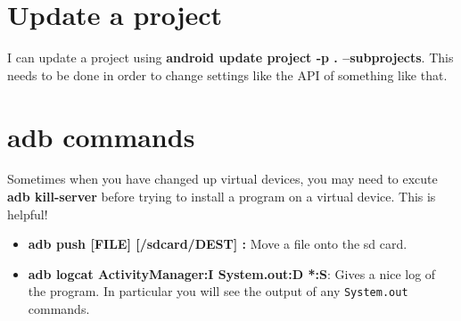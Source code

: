 \documentclass[english]{article}
\begin{document}
\section*{Update a project}
I can update a project using \textbf{android update project -p . --subprojects}. This needs to be done in order to change settings like the API of something like that.

\section*{adb commands}
Sometimes when you have changed up virtual devices, you may need to excute \textbf{adb kill-server} before trying to install a program on a virtual device. This is helpful!
\begin{itemize}
\item \textbf{adb push [FILE] [/sdcard/DEST] :} Move a file onto the sd card.
\item \textbf{adb logcat ActivityManager:I System.out:D *:S}: Gives a nice log of the program. In particular you will see the output of any \texttt{System.out} commands.
\end{itemize}
\end{document}
